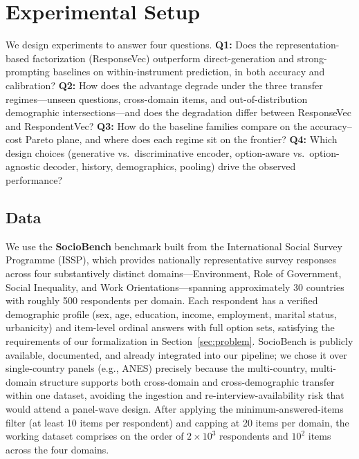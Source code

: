 \section{Experimental Setup}
\label{sec:experimental-setup}

We design experiments to answer four questions. \textbf{Q1:} Does the representation-based factorization (ResponseVec) outperform direct-generation and strong-prompting baselines on within-instrument prediction, in both accuracy and calibration? \textbf{Q2:} How does the advantage degrade under the three transfer regimes---unseen questions, cross-domain items, and out-of-distribution demographic intersections---and does the degradation differ between ResponseVec and RespondentVec? \textbf{Q3:} How do the baseline families compare on the accuracy--cost Pareto plane, and where does each regime sit on the frontier? \textbf{Q4:} Which design choices (generative vs.\ discriminative encoder, option-aware vs.\ option-agnostic decoder, history, demographics, pooling) drive the observed performance?

\subsection{Data}
\label{sec:data}

We use the \textbf{SocioBench} benchmark built from the International Social Survey Programme (ISSP), which provides nationally representative survey responses across four substantively distinct domains---Environment, Role of Government, Social Inequality, and Work Orientations---spanning approximately 30 countries with roughly 500 respondents per domain. Each respondent has a verified demographic profile (sex, age, education, income, employment, marital status, urbanicity) and item-level ordinal answers with full option sets, satisfying the requirements of our formalization in Section~\ref{sec:problem}. SocioBench is publicly available, documented, and already integrated into our pipeline; we chose it over single-country panels (e.g., ANES) precisely because the multi-country, multi-domain structure supports both cross-domain and cross-demographic transfer within one dataset, avoiding the ingestion and re-interview-availability risk that would attend a panel-wave design. After applying the minimum-answered-items filter (at least 10 items per respondent) and capping at 20 items per domain, the working dataset comprises on the order of $2\times10^3$ respondents and $10^2$ items across the four domains.

